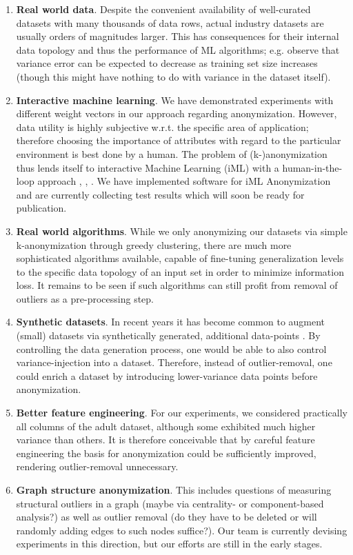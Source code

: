 \documentclass{llncs}
\begin{document}
\begin{enumerate}
	\item \textbf{Real world data}. Despite the convenient availability of well-curated datasets with many thousands of data rows, actual industry datasets are usually orders of magnitudes larger. This has consequences for their internal data topology and thus the performance of ML algorithms; e.g. \cite{brain1999effect} observe that variance error can be expected to decrease as training set size increases (though this might have nothing to do with variance in the dataset itself).
	
	\item \textbf{Interactive machine learning}. We have demonstrated experiments with different weight vectors in our approach regarding anonymization. However, data utility is highly subjective w.r.t. the specific area of application; therefore choosing the importance of attributes with regard to the particular environment is best done by a human. The problem of (k-)anonymization thus lends itself to interactive Machine Learning (iML) with a human-in-the-loop approach \cite{Holzinger:2016:iML}, \cite{Kieseberg:2016:Doctor-in-the-Loop}, \cite{iMLExperiment}. We have implemented software for iML Anonymization and are currently collecting test results which will soon be ready for publication.
	
	\item \textbf{Real world algorithms}. While we only anonymizing our datasets via simple k-anonymization through greedy clustering, there are much more sophisticated algorithms available, capable of fine-tuning generalization levels to the specific data topology of an input set in order to minimize information loss. It remains to be seen if such algorithms can still profit from removal of outliers as a pre-processing step.
	
	\item \textbf{Synthetic datasets}. In recent years it has become common to augment (small) datasets via synthetically generated, additional data-points \cite{wong2016understanding}. By controlling the data generation process, one would be able to also control variance-injection into a dataset. Therefore, instead of outlier-removal, one could enrich a dataset by introducing lower-variance data points before anonymization.
	
	\item \textbf{Better feature engineering}. For our experiments, we considered practically all columns of the adult dataset, although some exhibited much higher variance than others. It is therefore conceivable that by careful feature engineering the basis for anonymization could be sufficiently improved, rendering outlier-removal unnecessary.

	\item \textbf{Graph structure anonymization}. This includes questions of measuring structural outliers in a graph (maybe via centrality- or component-based analysis?) as well as outlier removal (do they have to be deleted or will randomly adding edges to such nodes suffice?). Our team is currently devising experiments in this direction, but our efforts are still in the early stages.
\end{enumerate}
\end{document}
